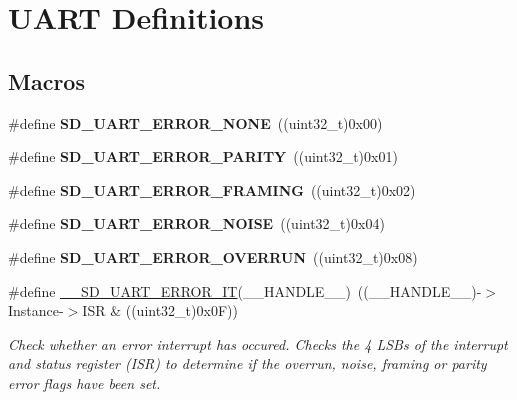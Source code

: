 \hypertarget{group___s_d___u_a_r_t___defines}{}\section{U\+A\+RT Definitions}
\label{group___s_d___u_a_r_t___defines}
\subsection*{Macros}
\begin{DoxyCompactItemize}
\item 
\mbox{\label{group___s_d___u_a_r_t___defines_ga1ec3c03e65c9a87449864e1167206fca}} 
\#define {\bfseries S\+D\+\_\+\+U\+A\+R\+T\+\_\+\+E\+R\+R\+O\+R\+\_\+\+N\+O\+NE}~((uint32\+\_\+t)0x00)
\item 
\mbox{\label{group___s_d___u_a_r_t___defines_ga02ee072655d096ffb824b47ddc4e54b5}} 
\#define {\bfseries S\+D\+\_\+\+U\+A\+R\+T\+\_\+\+E\+R\+R\+O\+R\+\_\+\+P\+A\+R\+I\+TY}~((uint32\+\_\+t)0x01)
\item 
\mbox{\label{group___s_d___u_a_r_t___defines_ga154883be8d0b62779f64796fb06e0142}} 
\#define {\bfseries S\+D\+\_\+\+U\+A\+R\+T\+\_\+\+E\+R\+R\+O\+R\+\_\+\+F\+R\+A\+M\+I\+NG}~((uint32\+\_\+t)0x02)
\item 
\mbox{\label{group___s_d___u_a_r_t___defines_ga5ef749710f0f853e9ca9979e3a0a8d22}} 
\#define {\bfseries S\+D\+\_\+\+U\+A\+R\+T\+\_\+\+E\+R\+R\+O\+R\+\_\+\+N\+O\+I\+SE}~((uint32\+\_\+t)0x04)
\item 
\mbox{\label{group___s_d___u_a_r_t___defines_ga05c90f74bbab0b07bd42038f6c024c48}} 
\#define {\bfseries S\+D\+\_\+\+U\+A\+R\+T\+\_\+\+E\+R\+R\+O\+R\+\_\+\+O\+V\+E\+R\+R\+UN}~((uint32\+\_\+t)0x08)
\item 
\#define \mbox{\hyperlink{group___s_d___u_a_r_t___defines_gaecb6d035303fa5bf3942fdfa3f78867f}{\+\_\+\+\_\+\+S\+D\+\_\+\+U\+A\+R\+T\+\_\+\+E\+R\+R\+O\+R\+\_\+\+IT}}(\+\_\+\+\_\+\+H\+A\+N\+D\+L\+E\+\_\+\+\_\+)~((\+\_\+\+\_\+\+H\+A\+N\+D\+L\+E\+\_\+\+\_\+)-\/$>$Instance-\/$>$I\+SR \& ((uint32\+\_\+t)0x0\+F))
\begin{DoxyCompactList}\small\item\em Check whether an error interrupt has occured. Checks the 4 L\+S\+Bs of the interrupt and status register (I\+SR) to determine if the overrun, noise, framing or parity error flags have been set. \end{DoxyCompactList}\item 

\end{DoxyCompactItemize}
